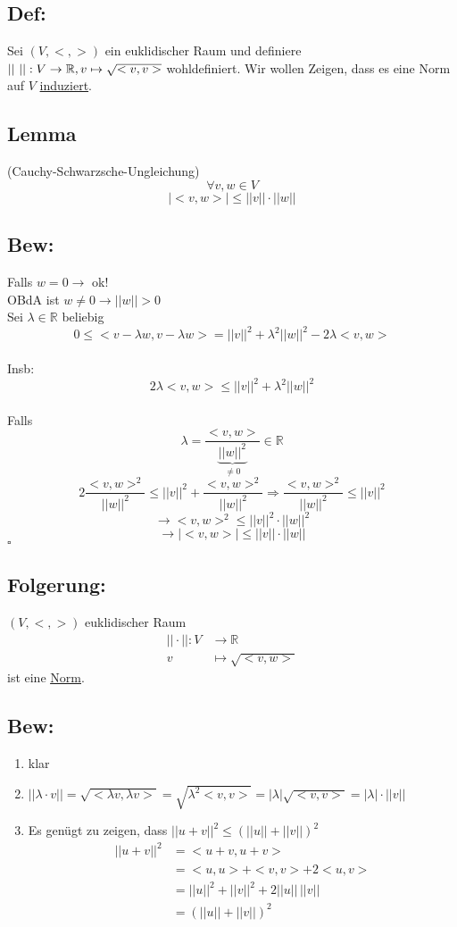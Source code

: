 \documentclass[titlepage,12pt,a4paper,ngerman]{report}
\newenvironment{bew}[1]{\subsection{Bew: #1}}{\hfill$\square$}
\newcommand{\Bew}[2]{\begin{bew}{#1}#2\end{bew}}
\newcommand{\ub}[1]{\underbrace{#1}}
\begin{document}
\subsection{Def:}
Sei $(V,<,>)$ ein euklidischer Raum und definiere $||\ ||: V \to \mathbb R,\\v \mapsto \sqrt{<v,v>}$ wohldefiniert. Wir wollen Zeigen, dass es eine Norm auf $V$ \underline{induziert}.
\subsection{Lemma}
(Cauchy-Schwarzsche-Ungleichung)
$$\forall v, w \in V$$
$$|<v,w>| \leq ||v|| \cdot ||w||$$
\Bew{}{
	Falls $w=0 \rightarrow$ ok!\\
	OBdA ist $ w \neq 0 \rightarrow ||w||>0 $\\
	Sei $  \lambda \in \mathbb{R} $ beliebig \\
	$$ 0 \le < v- \lambda w , v - \lambda w > = ||v||^2+ \lambda^2 ||w||^2 - 2 \lambda <v,w> $$\\
	Insb:
	$$ 2 \lambda <v,w> \le ||v||^2 + \lambda^2 ||w||^2 $$\\
	Falls $$ \lambda = \frac{<v,w>}{\ub{||w||^2}_{\neq 0}} \in \mathbb{R} $$
	$$ 2 \frac{<v,w>^2}{||w||^2} \le ||v||^2 + \frac{<v,w>^2}{||w||^2} \Rightarrow \frac{<v,w>^2}{||w||^2} \le ||v||^2 $$
	$$ \rightarrow <v,w>^2 \le ||v||^2 \cdot ||w||^2$$
	$$ \rightarrow |<v,w>| \le ||v|| \cdot ||w|| $$
}
\subsection{Folgerung:}
$ (V,<,>) $ euklidischer Raum\\
\begin{align*}
||\cdot ||: V & \to \mathbb{R}\\
v & \mapsto \sqrt{<v,w>}
\end{align*}
ist eine \underline{\underline{Norm}}.
\subsection{Bew:}
\begin{enumerate}[1)]
	\item klar
	\item $ ||\lambda \cdot v || = \sqrt{< \lambda v,  \lambda v>} = \sqrt{\lambda^2 <v,v>} = |\lambda| \sqrt{<v,v>} = |\lambda| \cdot ||v|| $
	\item Es genügt zu zeigen, dass $ ||u+v||^2 \le (||u|| + ||v||)^2 $\\
	\begin{align*}
	||u+v||^2 & = < u+v, u+v>\\
	& = < u,u> + <v,v> + 2 <u,v>\\
	& = ||u||^2 + ||v||^2 + 2 ||u||\, ||v||\\
	& = (||u|| + ||v||)^2
	\end{align*}
\end{enumerate}
\end{document}
